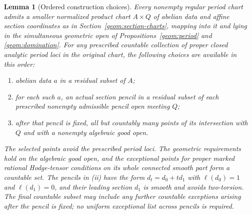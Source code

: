 \documentclass[11pt]{amsart}
\newtheorem{lemma}[theorem]{Lemma}
\theoremstyle{definition}
\theoremstyle{remark}
\numberwithin{equation}{section}
\begin{document}
\begin{lemma}[Ordered construction choices]\label{geom:genericity}
Every nonempty regular period chart admits a smaller normalized product
chart $A\times Q$ of abelian data and affine section coordinates as in
Section~\ref{geom:section-charts},
mapping into it and lying in the simultaneous geometric open of
Propositions~\ref{geom:period} and \ref{geom:domination}.
For any prescribed countable collection of proper closed analytic
period loci in the original chart, the following choices are available
in this order:
\begin{enumerate}
\item abelian data $a$ in a residual subset of $A$;
\item for each such $a$, an actual section pencil in a residual subset
of each prescribed nonempty admissible pencil open meeting $Q$;
\item after that pencil is fixed, all but countably many points of its
intersection with $Q$ and with a nonempty algebraic good open.
\end{enumerate}
The selected points avoid the prescribed period loci.  The geometric
requirements hold on the algebraic good open, and the exceptional points
for proper marked rational Hodge-tensor conditions on its whole connected
smooth part form a countable set.  The pencils in
\textup{(ii)} have the form $d_t=d_0+td_1$ with $\ell(d_0)=1$ and
$\ell(d_1)=0$, and their leading section $d_1$ is smooth and avoids
two-torsion.  The final countable subset may include any further
countable exceptions arising after the pencil is fixed; no uniform
exceptional list across pencils is required.
\end{lemma}
\end{document}
